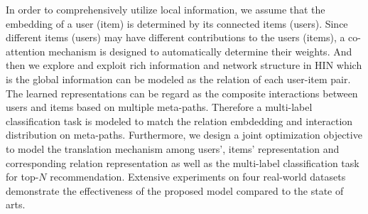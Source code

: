 In order to comprehensively utilize local information, we assume that the embedding of a user (item) is determined by its connected items (users). Since different items (users) may have different contributions to the users (items), a co-attention mechanism is designed to automatically determine their weights. And then we explore and exploit rich information and network structure in HIN which is the global information can be modeled as the relation of each user-item pair. The learned representations can be regard as the composite interactions between users and items based on multiple meta-paths. Therefore a multi-label classification task is modeled to match the relation embdedding and interaction distribution on meta-paths.
Furthermore, we design a joint optimization objective to model the translation mechanism among users', items' representation and corresponding relation representation as well as the multi-label classification task for top-$N$ recommendation.
Extensive experiments on four real-world datasets demonstrate the effectiveness of the proposed model compared to the state of arts.
